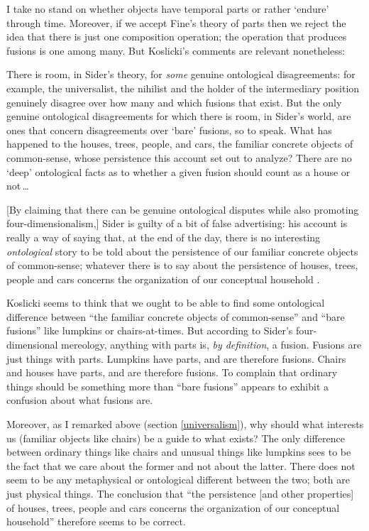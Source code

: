 \documentclass[11pt]{article}
\newenvironment{squote}{%
\begin{spacing}{1}
\begin{list}{}{%
\setlength{\labelwidth}{0pt}%
\rightmargin\leftmargin%
}
\item\relax
}{%
\end{list}%
\end{spacing}
}
\begin{document}
\begin{spacing}{1.5}
I take no stand on whether objects have temporal parts or rather
`endure' through time.  Moreover, if we accept Fine's theory of parts
then we reject the idea that there is just one composition operation;
the operation that produces fusions is one among many.  But Koslicki's
comments are relevant nonetheless:

\begin{squote}
There is room, in Sider's theory, for {\em some} genuine ontological
disagreements: for example, the universalist, the nihilist and the
holder of the intermediary position genuinely disagree over how many
and which fusions that exist.  But the only genuine ontological
disagreements for which there is room, in Sider's world, are ones that
concern disagreements over `bare' fusions, so to speak.  What has
happened to the houses, trees, people, and cars, the familiar concrete
objects of common-sense, whose persistence this account set out to
analyze?  There are no `deep' ontological facts as to whether a given
fusion should count as a house or not\,\ldots

[By claiming that there can be genuine ontological disputes while also
  promoting four-dimensionalism,] Sider is guilty of a bit of false
advertising: his account is really a way of saying that, at the end of
the day, there is no interesting {\em ontological} story to be told
about the persistence of our familiar concrete objects of
common-sense; whatever there is to say about the persistence of
houses, trees, people and cars concerns the organization of our
conceptual household \citeyearpar[124--125]{koslicki2003}.
\end{squote}

Koslicki seems to think that we ought to be able to find some
ontological difference between ``the familiar concrete objects of
common-sense'' and ``bare fusions'' like lumpkins or chairs-at-times.
But according to Sider's four-dimensional mereology, anything with
parts is, {\em by definition}, a fusion.  Fusions are just things with
parts.  Lumpkins have parts, and are therefore fusions.  Chairs and
houses have parts, and are therefore fusions.  To complain that
ordinary things should be something more than ``bare fusions'' appears
to exhibit a confusion about what fusions are.

Moreover, as I remarked above (section \ref{universalism}), why should
what interests us (familiar objects like chairs) be a guide to what
exists?  The only difference between ordinary things like chairs and
unusual things like lumpkins sees to be the fact that we care about
the former and not about the latter.  There does not seem to be any
metaphysical or ontological different between the two; both are just
physical things.  The conclusion that ``the persistence [and other
  properties] of houses, trees, people and cars concerns the
organization of our conceptual household'' therefore seems to be
correct.


\end{spacing}
\end{document}
